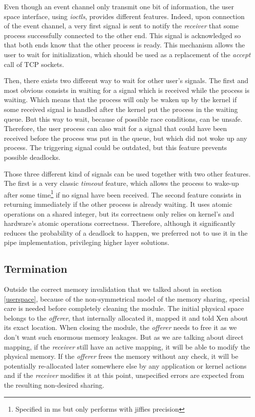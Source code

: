 \documentclass[journal]{IEEEtran}
\begin{document}
Even though an event channel only transmit one bit of information, the user space interface, using \emph{ioctls}, provides different features. Indeed, upon connection of the event channel, a very first signal is sent to notify the \emph{receiver} that some process successfully connected to the other end. This signal is acknowledged so that both ends know that the other process is ready. This mechanism allows the user to wait for initialization, which should be used as a replacement of the \emph{accept} call of TCP sockets.

Then, there exists two different way to wait for other user's signals. The first and most obvious consists in waiting for a signal which is received while the process is waiting. Which means that the process will only be waken up by the kernel if some received signal is handled after the kernel put the process in the waiting queue.  But this way to wait, because of possible race conditions, can be unsafe. Therefore, the user process can also wait for a signal that could have been received before the process was put in the queue, but which did not woke up any process. The triggering signal could be outdated, but this feature prevents possible deadlocks. 

Those three different kind of signals can be used together with two other features. The first is a very classic \emph{timeout} feature, which allows the process to wake-up after some time\footnote{Specified in ms but only performs with jiffies precision} if no signal have been received. The second feature consists in returning immediately if the other process is already waiting. It uses atomic operations on a shared integer, but its correctness only relies on kernel's and hardware's atomic operations correctness. Therefore, although it significantly reduces the probability of a deadlock to happen, we preferred not to use it in the pipe implementation, privileging higher layer solutions.

\subsection{Termination}
\label{Termination}

Outside the correct memory invalidation that we talked about in section \ref{userspace}, because of the non-symmetrical model of the memory sharing, special care is needed before completely cleaning the module. The initial physical space belongs to the \emph{offerer}, that internally allocated it, mapped it and told Xen about its exact location. When closing the module, the \emph{offerer} needs to free it as we don't want such enormous memory leakages. But as we are talking about direct mapping, if the \emph{receiver} still have an active mapping, it will be able to modify the physical memory.
If the \emph{offerer} frees the memory without any check, it will be potentially re-allocated later somewhere else by any application or kernel actions and if the \emph{receiver} modifies it at this point, unspecified errors are expected from the resulting non-desired sharing.
\end{document}
